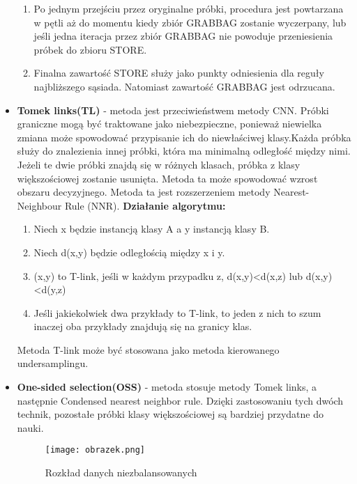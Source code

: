 \documentclass{article}
\begin{document}
\begin{itemize}
\begin{enumerate}
        \item Po jednym przejściu przez oryginalne próbki, procedura jest powtarzana w pętli aż do momentu kiedy zbiór GRABBAG zostanie wyczerpany, lub  jeśli jedna iteracja przez zbiór GRABBAG nie powoduje przeniesienia próbek do zbioru STORE.
    
        \item Finalna zawartość STORE służy jako punkty odniesienia dla reguły najbliższego sąsiada. Natomiast zawartość GRABBAG jest odrzucana.
        
    \end{enumerate}
    
    \newline
    \item \textbf{Tomek links(TL)} - metoda jest przeciwieństwem metody CNN. 
    \cite{elhassan2016classification}
    Próbki graniczne mogą być traktowane jako niebezpieczne, ponieważ niewielka zmiana może spowodować przypisanie ich do niewłaściwej klasy.Każda próbka służy do znalezienia innej próbki, która ma minimalną odległość między nimi. Jeżeli te dwie próbki znajdą się w różnych klasach, próbka z klasy większościowej zostanie usunięta. Metoda ta może spowodować wzrost obszaru decyzyjnego. Metoda ta jest rozszerzeniem metody Nearest-Neighbour Rule (NNR). 
    \newline
    \textbf{Działanie algorytmu:}
    \begin{enumerate}
        \item Niech x będzie instancją klasy A a y instancją klasy B.
        \item Niech d(x,y) będzie odległością między x i y.
        \item(x,y) to T-link, jeśli w każdym przypadku z, d(x,y)<d(x,z) lub d(x,y)<d(y,z)
        \item Jeśli jakiekolwiek dwa przykłady to T-link, to jeden z nich to szum inaczej oba przykłady znajdują się na granicy klas.
    \end{enumerate}

    Metoda T-link może być stosowana jako metoda kierowanego undersamplingu.
    \break
    \item \textbf{One-sided selection(OSS)} - metoda stosuje metody Tomek links, a następnie Condensed nearest neighbor rule.
    \cite{6891771}
    Dzięki zastosowaniu tych dwóch technik, pozostałe próbki klasy większościowej są bardziej przydatne do nauki.
    
    \begin{figure}[h!]
\texttt{[image: obrazek.png]}
\caption{Rozkład danych niezbalansowanych} 
\label{fig:obrazek}
\end{figure}
    

\end{itemize}
\end{document}
